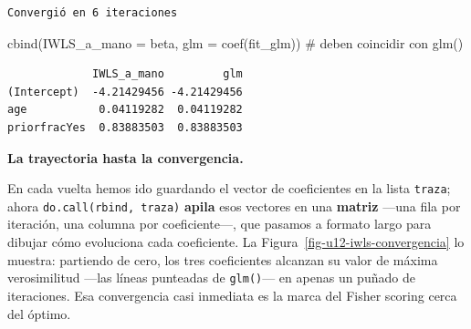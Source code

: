 \documentclass[
  letterpaper,
  DIV=11,
  numbers=noendperiod]{scrartcl}
\newenvironment{Shaded}{\begin{snugshade}}{\end{snugshade}}
\newcommand{\AttributeTok}[1]{\textcolor[rgb]{0.40,0.45,0.13}{#1}}
\newcommand{\CommentTok}[1]{\textcolor[rgb]{0.37,0.37,0.37}{#1}}
\newcommand{\FunctionTok}[1]{\textcolor[rgb]{0.28,0.35,0.67}{#1}}
\newcommand{\NormalTok}[1]{\textcolor[rgb]{0.00,0.23,0.31}{#1}}
\begin{document}
\begin{verbatim}
Convergió en 6 iteraciones
\end{verbatim}

\begin{Shaded}
\begin{Highlighting}[]
\FunctionTok{cbind}\NormalTok{(}\AttributeTok{IWLS\_a\_mano =}\NormalTok{ beta, }\AttributeTok{glm =} \FunctionTok{coef}\NormalTok{(fit\_glm))   }\CommentTok{\# deben coincidir con glm()}
\end{Highlighting}
\end{Shaded}

\begin{verbatim}
             IWLS_a_mano         glm
(Intercept)  -4.21429456 -4.21429456
age           0.04119282  0.04119282
priorfracYes  0.83883503  0.83883503
\end{verbatim}

\textbf{La trayectoria hasta la convergencia.}

En cada vuelta hemos ido guardando el vector de coeficientes en la lista
\texttt{traza}; ahora \texttt{do.call(rbind,\ traza)} \textbf{apila}
esos vectores en una \textbf{matriz} ---una fila por iteración, una
columna por coeficiente---, que pasamos a formato largo para dibujar
cómo evoluciona cada coeficiente. La
Figura~\ref{fig-u12-iwls-convergencia} lo muestra: partiendo de cero,
los tres coeficientes alcanzan su valor de máxima verosimilitud ---las
líneas punteadas de \texttt{glm()}--- en apenas un puñado de
iteraciones. Esa convergencia casi inmediata es la marca del Fisher
scoring cerca del óptimo.
\end{document}
